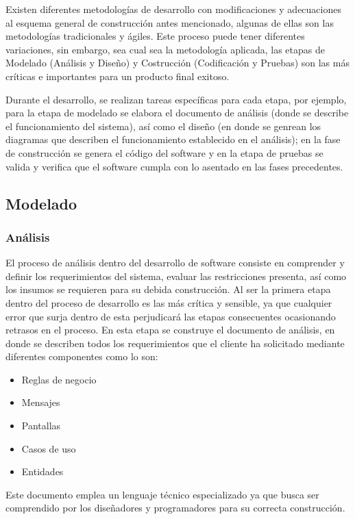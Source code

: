 Existen diferentes metodologías de desarrollo con modificaciones y adecuaciones al esquema general de construcción antes mencionado, algunas de ellas son las metodologías tradicionales y ágiles. Este proceso puede tener diferentes variaciones, sin embargo, sea cual sea la metodología aplicada, las etapas de Modelado (Análisis y Diseño) y Costrucción (Codificación y Pruebas) son las más críticas e importantes para un producto final exitoso.

Durante el desarrollo, se realizan tareas específicas para cada etapa, por ejemplo, para la etapa de modelado se elabora el documento de análisis (donde se describe el funcionamiento del sistema), así como el diseño (en donde se genrean los diagramas que describen el funcionamiento establecido en el análisis); en la fase de construcción se genera el código del software y en la etapa de pruebas se valida y verifica que el software cumpla con lo asentado en las fases precedentes.

\subsection{Modelado}

\subsubsection{Análisis}

El proceso de análisis dentro del desarrollo de software consiste en comprender y definir los requerimientos del sistema, evaluar las restricciones presenta, así como los insumos se requieren para su debida construcción.
Al ser la primera etapa dentro del proceso de desarrollo es las más crítica y sensible, ya que cualquier error que surja dentro de esta perjudicará las etapas consecuentes ocasionando retrasos en el proceso.
En esta etapa se construye el documento de análisis, en donde se describen todos los requerimientos que el cliente ha solicitado mediante diferentes componentes como lo son:

\begin{itemize}
	\item Reglas de negocio
	\item Mensajes
	\item Pantallas
	\item Casos de uso
	\item Entidades
\end{itemize}

 Este documento emplea un lenguaje técnico especializado ya que busca ser comprendido por los diseñadores y programadores para su correcta construcción.

